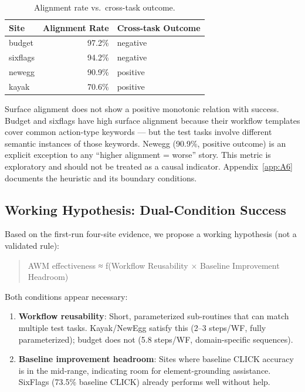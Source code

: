 \documentclass{article}
\providecommand{\tightlist}{%
  \setlength{\itemsep}{0pt}\setlength{\parskip}{0.8em}}
\begin{document}
{\begin{longtable}[]{@{}lrl@{}}
\caption{Alignment rate vs.~cross-task outcome.}\label{tab:alignment-rate-vs-cross-task-outcome}\\

\toprule\noalign{}
Site & Alignment Rate & Cross-task Outcome \\
\midrule\noalign{}
\endhead
\bottomrule\noalign{}
\endlastfoot
budget & 97.2\% & negative \\
sixflags & 94.2\% & negative \\
newegg & 90.9\% & positive \\
kayak & 70.6\% & positive \\
\end{longtable}
}

Surface alignment does not show a positive monotonic relation with
success. Budget and sixflags have high surface alignment because their
workflow templates cover common action-type keywords --- but the test
tasks involve different semantic instances of those keywords. Newegg
(90.9\%, positive outcome) is an explicit exception to any ``higher alignment
= worse'' story. This metric is exploratory and should not be treated as
a causal indicator. Appendix~\ref{app:A6} documents the heuristic and
its boundary conditions.

\subsection{Working Hypothesis: Dual-Condition
Success}\label{working-hypothesis-dual-condition-success}

Based on the first-run four-site evidence, we propose a working
hypothesis (not a validated rule):

\begin{quote}
AWM effectiveness ≈ f(Workflow Reusability × Baseline Improvement
Headroom)
\end{quote}

Both conditions appear necessary:

\begin{enumerate}
\def\labelenumi{\arabic{enumi}.}
\tightlist
\item
  \textbf{Workflow reusability}: Short, parameterized sub-routines that
  can match multiple test tasks. Kayak/NewEgg satisfy this (2--3
  steps/WF, fully parameterized); budget does not (5.8 steps/WF,
  domain-specific sequences).
\item
  \textbf{Baseline improvement headroom}: Sites where baseline CLICK
  accuracy is in the mid-range, indicating room for element-grounding
  assistance. SixFlags (73.5\% baseline CLICK) already performs well
  without help.
\end{enumerate}
\end{document}
